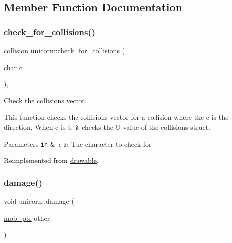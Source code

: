 \subsection{Member Function Documentation}
\mbox{\label{classunicorn_a40fe782f273abf46f6121db9aa4bf77a}} 
\subsubsection{\texorpdfstring{check\+\_\+for\+\_\+collisions()}{check\_for\_collisions()}}
{\footnotesize\ttfamily \hyperlink{structcollision}{collision} unicorn\+::check\+\_\+for\+\_\+collisions (\begin{DoxyParamCaption}\item[{char}]{c }\end{DoxyParamCaption})\hspace{0.3cm}{\ttfamily [override]}, {\ttfamily [virtual]}}



Check the collisions vector. 

This function checks the collisions vector for a collision where the c is the direction. When c is \textquotesingle{}U\textquotesingle{} it checks the U value of the collisions struct.


\begin{DoxyParams}[1]{Parameters}
\mbox{\tt in}  & {\em c} & The character to check for \\
\hline
\end{DoxyParams}


Reimplemented from \hyperlink{classdrawable_abbc6e0089d502ba48c3fcb9c96e3966e}{drawable}.

\mbox{\label{classunicorn_a8b5a22ab1b26daa540ceb09b5b5747d8}} 
\subsubsection{\texorpdfstring{damage()}{damage()}}
{\footnotesize\ttfamily void unicorn\+::damage (\begin{DoxyParamCaption}\item[{\hyperlink{typedefs_8hpp_a09ee7f853fc9bc830a9445a06fd53d4b}{mob\+\_\+ptr}}]{other }\end{DoxyParamCaption})}



